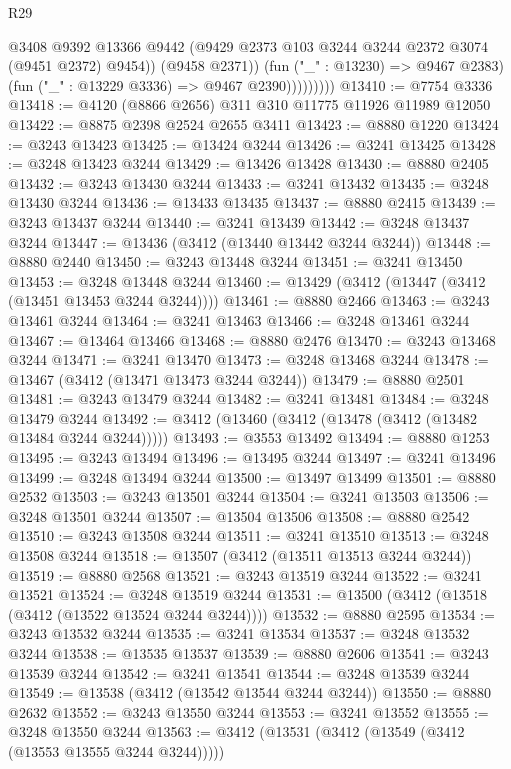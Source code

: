 \begin{lexlean}{R29}
\begin{coremodule}
                        @3408
                        @9392
                        @13366
                        @9442
                        (@9429 @2373 @103 @3244 @3244 @2372 @3074 (@9451 @2372) @9454))
                      (@9458 @2371))
                    (fun ("_" : @13230) => @9467 @2383)
                    (fun ("_" : @13229 @3336) => @9467 @2390)))))))))
@13410 := @7754 @3336
@13418 := @4120 (@8866 @2656) @311 @310 @11775 @11926 @11989 @12050
@13422 := @8875 @2398 @2524 @2655 @3411
@13423 := @8880 @1220
@13424 := @3243 @13423
@13425 := @13424 @3244
@13426 := @3241 @13425
@13428 := @3248 @13423 @3244
@13429 := @13426 @13428
@13430 := @8880 @2405
@13432 := @3243 @13430 @3244
@13433 := @3241 @13432
@13435 := @3248 @13430 @3244
@13436 := @13433 @13435
@13437 := @8880 @2415
@13439 := @3243 @13437 @3244
@13440 := @3241 @13439
@13442 := @3248 @13437 @3244
@13447 := @13436 (@3412 (@13440 @13442 @3244 @3244))
@13448 := @8880 @2440
@13450 := @3243 @13448 @3244
@13451 := @3241 @13450
@13453 := @3248 @13448 @3244
@13460 := @13429 (@3412 (@13447 (@3412 (@13451 @13453 @3244 @3244))))
@13461 := @8880 @2466
@13463 := @3243 @13461 @3244
@13464 := @3241 @13463
@13466 := @3248 @13461 @3244
@13467 := @13464 @13466
@13468 := @8880 @2476
@13470 := @3243 @13468 @3244
@13471 := @3241 @13470
@13473 := @3248 @13468 @3244
@13478 := @13467 (@3412 (@13471 @13473 @3244 @3244))
@13479 := @8880 @2501
@13481 := @3243 @13479 @3244
@13482 := @3241 @13481
@13484 := @3248 @13479 @3244
@13492 := @3412 (@13460 (@3412 (@13478 (@3412 (@13482 @13484 @3244 @3244)))))
@13493 := @3553 @13492
@13494 := @8880 @1253
@13495 := @3243 @13494
@13496 := @13495 @3244
@13497 := @3241 @13496
@13499 := @3248 @13494 @3244
@13500 := @13497 @13499
@13501 := @8880 @2532
@13503 := @3243 @13501 @3244
@13504 := @3241 @13503
@13506 := @3248 @13501 @3244
@13507 := @13504 @13506
@13508 := @8880 @2542
@13510 := @3243 @13508 @3244
@13511 := @3241 @13510
@13513 := @3248 @13508 @3244
@13518 := @13507 (@3412 (@13511 @13513 @3244 @3244))
@13519 := @8880 @2568
@13521 := @3243 @13519 @3244
@13522 := @3241 @13521
@13524 := @3248 @13519 @3244
@13531 := @13500 (@3412 (@13518 (@3412 (@13522 @13524 @3244 @3244))))
@13532 := @8880 @2595
@13534 := @3243 @13532 @3244
@13535 := @3241 @13534
@13537 := @3248 @13532 @3244
@13538 := @13535 @13537
@13539 := @8880 @2606
@13541 := @3243 @13539 @3244
@13542 := @3241 @13541
@13544 := @3248 @13539 @3244
@13549 := @13538 (@3412 (@13542 @13544 @3244 @3244))
@13550 := @8880 @2632
@13552 := @3243 @13550 @3244
@13553 := @3241 @13552
@13555 := @3248 @13550 @3244
@13563 := @3412 (@13531 (@3412 (@13549 (@3412 (@13553 @13555 @3244 @3244)))))

\end{coremodule}
\end{lexlean}
